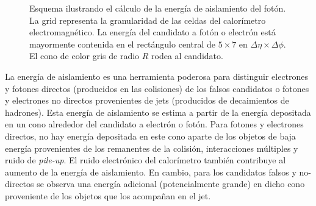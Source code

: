 





\begin{figure}[!htb]
  \centering

  \resizebox{0.5\textwidth}{!}{
    
  }

  \caption{Esquema ilustrando el cálculo de la energía de aislamiento del fotón. La grid representa
    la granularidad de las celdas del calorímetro electromagnético. La energía del candidato a fotón o electrón
    está mayormente contenida en el rectángulo central de $5 \times 7$ en $\Delta\eta \times \Delta\phi$. El
    cono de color gris de radio $R$ rodea al candidato.}
  \label{fig:topoetcone}

\end{figure}


La energía de aislamiento es una herramienta poderosa para distinguir electrones
y fotones directos (producidos en las colisiones) de los falsos candidatos o
fotones y electrones no directos provenientes de jets (producidos de
decaimientos de hadrones). Esta energía de aislamiento se estima a partir de la energía depositada en un
cono alrededor del candidato a electrón o fotón. Para fotones y electrones
directos, no hay energía depositada en este cono aparte de los objetos de baja
energía provenientes de los remanentes de la colisión, interacciones múltiples y
ruido de \emph{pile-up}. El ruido electrónico del calorímetro también contribuye al
aumento de la energía de aislamiento.
En cambio, para los candidatos falsos y no-directos se observa una energía adicional
(potencialmente grande) en dicho cono proveniente de los objetos que los acompañan en el jet.

